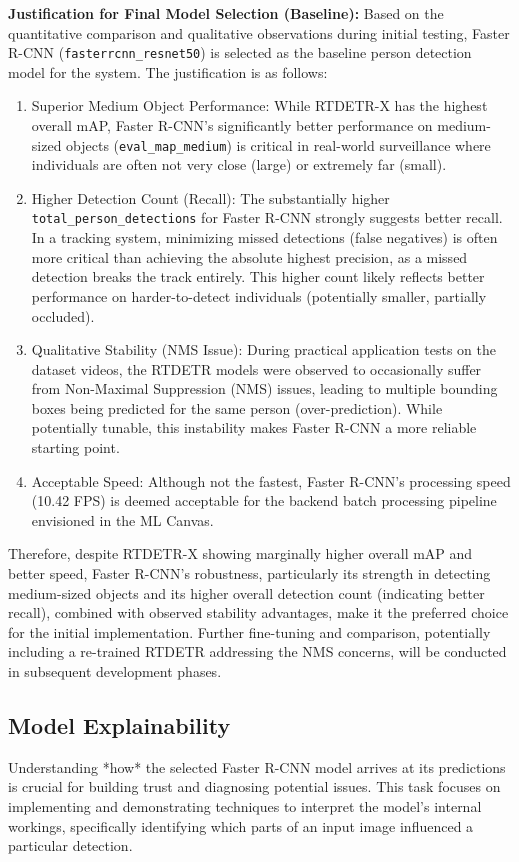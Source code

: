 \textbf{Justification for Final Model Selection (Baseline):}
Based on the quantitative comparison and qualitative observations during initial testing, Faster R-CNN (\texttt{fasterrcnn\_resnet50}) is selected as the baseline person detection model for the system. The justification is as follows:
\begin{enumerate}
    \item Superior Medium Object Performance: While RTDETR-X has the highest overall mAP, Faster R-CNN's significantly better performance on medium-sized objects (\texttt{eval\_map\_medium}) is critical in real-world surveillance where individuals are often not very close (large) or extremely far (small).
    \item Higher Detection Count (Recall): The substantially higher \texttt{total\_person\_detections} for Faster R-CNN strongly suggests better recall. In a tracking system, minimizing missed detections (false negatives) is often more critical than achieving the absolute highest precision, as a missed detection breaks the track entirely. This higher count likely reflects better performance on harder-to-detect individuals (potentially smaller, partially occluded).
    \item Qualitative Stability (NMS Issue): During practical application tests on the dataset videos, the RTDETR models were observed to occasionally suffer from Non-Maximal Suppression (NMS) issues, leading to multiple bounding boxes being predicted for the same person (over-prediction). While potentially tunable, this instability makes Faster R-CNN a more reliable starting point.
    \item Acceptable Speed: Although not the fastest, Faster R-CNN's processing speed (10.42 FPS) is deemed acceptable for the backend batch processing pipeline envisioned in the ML Canvas.
\end{enumerate}
Therefore, despite RTDETR-X showing marginally higher overall mAP and better speed, Faster R-CNN's robustness, particularly its strength in detecting medium-sized objects and its higher overall detection count (indicating better recall), combined with observed stability advantages, make it the preferred choice for the initial implementation. Further fine-tuning and comparison, potentially including a re-trained RTDETR addressing the NMS concerns, will be conducted in subsequent development phases.

\subsection{Model Explainability}
\label{subsection:model_explainability}
Understanding *how* the selected Faster R-CNN model arrives at its predictions is crucial for building trust and diagnosing potential issues. This task focuses on implementing and demonstrating techniques to interpret the model's internal workings, specifically identifying which parts of an input image influenced a particular detection.

